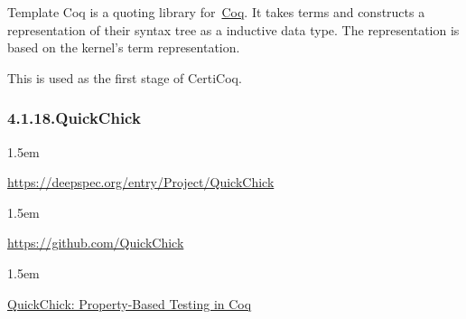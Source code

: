 \documentclass[12pt,twoside]{article}
\begin{document}
\noindent{}Template Coq is a quoting library for~\href{http://coq.inria.fr}{Coq}. It
takes  terms and constructs a representation of their syntax tree as
a  inductive data type. The representation is based on the kernel's
term representation.%

This is used as the first stage of CertiCoq.%

\subsubsection{4.1.18.\hspace*{0.5em}QuickChick}%

\begin{mddefinitions}%


\begin{mdbmarginx}{}{}{}{1.5em}%
\begin{mddefdata}%
\href{https://deepspec.org/entry/Project/QuickChick}{{\ttfamily https://\hspace{0pt}deepspec.\hspace{0pt}org/\hspace{0pt}entry/\hspace{0pt}Project/\hspace{0pt}QuickChick}}
\end{mddefdata}%
\end{mdbmarginx}%


\begin{mdbmarginx}{}{}{}{1.5em}%
\begin{mddefdata}%
\href{https://github.com/QuickChick}{{\ttfamily https://\hspace{0pt}github.\hspace{0pt}com/\hspace{0pt}QuickChick}}
\end{mddefdata}%
\end{mdbmarginx}%


\begin{mdbmarginx}{}{}{}{1.5em}%
\begin{mddefdata}%
\href{https://softwarefoundations.cis.upenn.edu/qc-current}{QuickChick: Property-Based Testing in Coq}%
\end{mddefdata}%
\end{mdbmarginx}%
\end{mddefinitions}%
\end{document}
